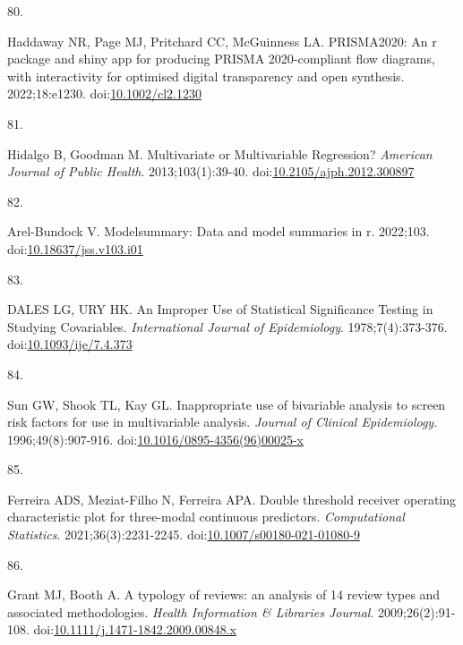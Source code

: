 \documentclass[
]{book}
\newlength{\cslhangindent}
\newlength{\csllabelwidth}
\newlength{\cslentryspacingunit} %
\newenvironment{CSLReferences}[2] %
 {%
  \setlength{\parindent}{0pt}
  \ifodd #1
  \let\oldpar\par
  \def\par{\hangindent=\cslhangindent\oldpar}
  \fi
  \setlength{\parskip}{#2\cslentryspacingunit}
 }%
 {}
\newcommand{\CSLLeftMargin}[1]{\parbox[t]{\csllabelwidth}{#1}}
\newcommand{\CSLRightInline}[1]{\parbox[t]{\linewidth - \csllabelwidth}{#1}\break}
\begin{document}
\begin{CSLReferences}{0}{0}
\leavevmode{}%
\CSLLeftMargin{80. }%
\CSLRightInline{Haddaway NR, Page MJ, Pritchard CC, McGuinness LA. PRISMA2020: An r package and shiny app for producing PRISMA 2020-compliant flow diagrams, with interactivity for optimised digital transparency and open synthesis. 2022;18:e1230. doi:\href{https://doi.org/10.1002/cl2.1230}{10.1002/cl2.1230}}

\leavevmode{}%
\CSLLeftMargin{81. }%
\CSLRightInline{Hidalgo B, Goodman M. Multivariate or Multivariable Regression? \emph{American Journal of Public Health}. 2013;103(1):39-40. doi:\href{https://doi.org/10.2105/ajph.2012.300897}{10.2105/ajph.2012.300897}}

\leavevmode{}%
\CSLLeftMargin{82. }%
\CSLRightInline{Arel-Bundock V. {\textbraceleft}Modelsummary{\textbraceright}: Data and model summaries in {\textbraceleft}r{\textbraceright}. 2022;103. doi:\href{https://doi.org/10.18637/jss.v103.i01}{10.18637/jss.v103.i01}}

\leavevmode{}%
\CSLLeftMargin{83. }%
\CSLRightInline{DALES LG, URY HK. An Improper Use of Statistical Significance Testing in Studying Covariables. \emph{International Journal of Epidemiology}. 1978;7(4):373-376. doi:\href{https://doi.org/10.1093/ije/7.4.373}{10.1093/ije/7.4.373}}

\leavevmode{}%
\CSLLeftMargin{84. }%
\CSLRightInline{Sun GW, Shook TL, Kay GL. Inappropriate use of bivariable analysis to screen risk factors for use in multivariable analysis. \emph{Journal of Clinical Epidemiology}. 1996;49(8):907-916. doi:\href{https://doi.org/10.1016/0895-4356(96)00025-x}{10.1016/0895-4356(96)00025-x}}

\leavevmode{}%
\CSLLeftMargin{85. }%
\CSLRightInline{Ferreira ADS, Meziat-Filho N, Ferreira APA. Double threshold receiver operating characteristic plot for three-modal continuous predictors. \emph{Computational Statistics}. 2021;36(3):2231-2245. doi:\href{https://doi.org/10.1007/s00180-021-01080-9}{10.1007/s00180-021-01080-9}}

\leavevmode{}%
\CSLLeftMargin{86. }%
\CSLRightInline{Grant MJ, Booth A. A typology of reviews: an analysis of 14 review types and associated methodologies. \emph{Health Information \& Libraries Journal}. 2009;26(2):91-108. doi:\href{https://doi.org/10.1111/j.1471-1842.2009.00848.x}{10.1111/j.1471-1842.2009.00848.x}}


\end{CSLReferences}
\end{document}
